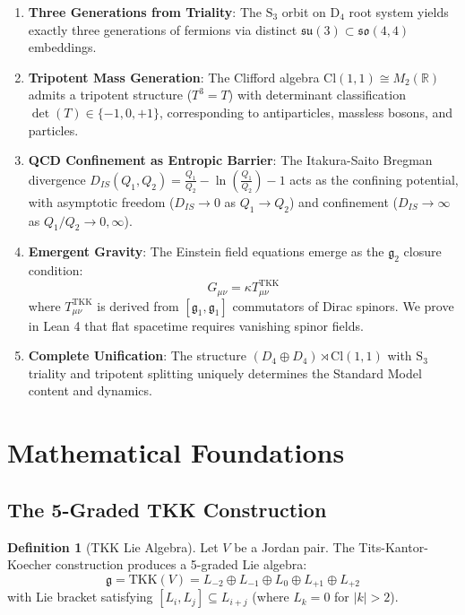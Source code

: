 \documentclass[12pt,a4paper]{article}
\theoremstyle{definition}
\newtheorem{definition}[theorem]{Definition}
\theoremstyle{axiom}
\newcommand{\g}{\mathfrak{g}}
\newcommand{\su}{\mathfrak{su}}
\newcommand{\so}{\mathfrak{so}}
\newcommand{\Cl}{\text{Cl}}
\newcommand{\TKK}{\text{TKK}}
\begin{document}
\begin{enumerate}[label=\textbf{R\arabic*}:, ref=R\arabic*]
\item \label{res:triality} \textbf{Three Generations from Triality}: The $\mathrm{S}_3$ orbit on D$_4$ root system yields exactly three generations of fermions via distinct $\su(3) \subset \so(4,4)$ embeddings.

\item \label{res:mass} \textbf{Tripotent Mass Generation}: The Clifford algebra $\Cl(1,1) \cong M_2(\mathbb{R})$ admits a tripotent structure ($T^3 = T$) with determinant classification $\det(T) \in \{-1,0,+1\}$, corresponding to antiparticles, massless bosons, and particles.

\item \label{res:confinement} \textbf{QCD Confinement as Entropic Barrier}: The Itakura-Saito Bregman divergence $D_{IS}(Q_1,Q_2) = \frac{Q_1}{Q_2} - \ln\left(\frac{Q_1}{Q_2}\right) - 1$ acts as the confining potential, with asymptotic freedom ($D_{IS} \to 0$ as $Q_1 \to Q_2$) and confinement ($D_{IS} \to \infty$ as $Q_1/Q_2 \to 0,\infty$).

\item \label{res:einstein} \textbf{Emergent Gravity}: The Einstein field equations emerge as the $\g_2$ closure condition:
\begin{equation}
G_{\mu\nu} = \kappa T_{\mu\nu}^{\TKK}
\end{equation}
where $T_{\mu\nu}^{\TKK}$ is derived from $[\g_1, \g_1]$ commutators of Dirac spinors. We prove in Lean 4 that flat spacetime requires vanishing spinor fields.

\item \label{res:unification} \textbf{Complete Unification}: The structure $(D_4 \oplus D_4) \rtimes \Cl(1,1)$ with $\mathrm{S}_3$ triality and tripotent splitting uniquely determines the Standard Model content and dynamics.
\end{enumerate}

\newpage

\section{Mathematical Foundations}

\subsection{The 5-Graded TKK Construction}

\begin{definition}[TKK Lie Algebra]
Let $V$ be a Jordan pair. The Tits-Kantor-Koecher construction produces a 5-graded Lie algebra:
\begin{equation}
\g = \TKK(V) = L_{-2} \oplus L_{-1} \oplus L_0 \oplus L_{+1} \oplus L_{+2}
\end{equation}
with Lie bracket satisfying $[L_i, L_j] \subseteq L_{i+j}$ (where $L_k = 0$ for $|k| > 2$).
\end{definition}
\end{document}
